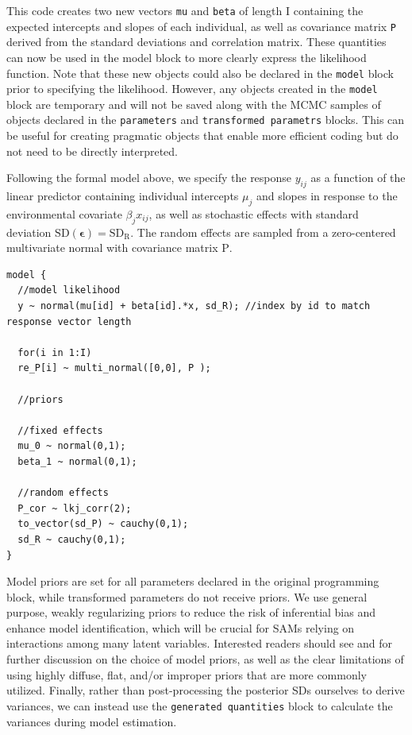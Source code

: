 \documentclass[
]{book}
\begin{document}
This code creates two new vectors \texttt{mu} and \texttt{beta} of length I containing the expected intercepts and slopes of each individual, as well as covariance matrix \texttt{P} derived from the standard deviations and correlation matrix. These quantities can now be used in the model block to more clearly express the likelihood function. Note that these new objects could also be declared in the \texttt{model} block prior to specifying the likelihood. However, any objects created in the \texttt{model} block are temporary and will not be saved along with the MCMC samples of objects declared in the \texttt{parameters} and \texttt{transformed\ parametrs} blocks. This can be useful for creating pragmatic objects that enable more efficient coding but do not need to be directly interpreted.

Following the formal model above, we specify the response \(y_{ij}\) as a function of the linear predictor containing individual intercepts \(\mu_j\) and slopes in response to the environmental covariate \(\beta_jx_{ij}\), as well as stochastic effects with standard deviation \(\mathrm{SD(\boldsymbol{\epsilon})}=\mathrm{SD_R}\). The random effects are sampled from a zero-centered multivariate normal with covariance matrix \(\boldsymbol{\mathrm{P}}\).

\begin{verbatim}
model {
  //model likelihood
  y ~ normal(mu[id] + beta[id].*x, sd_R); //index by id to match response vector length
  
  for(i in 1:I)
  re_P[i] ~ multi_normal([0,0], P );
  
  //priors
  
  //fixed effects
  mu_0 ~ normal(0,1);
  beta_1 ~ normal(0,1);
  
  //random effects
  P_cor ~ lkj_corr(2);
  to_vector(sd_P) ~ cauchy(0,1);
  sd_R ~ cauchy(0,1);
}
\end{verbatim}

Model priors are set for all parameters declared in the original programming block, while transformed parameters do not receive priors. We use general purpose, weakly regularizing priors to reduce the risk of inferential bias and enhance model identification, which will be crucial for SAMs relying on interactions among many latent variables. Interested readers should see \citet{Lemoine2019} and \citet{Rethinking} for further discussion on the choice of model priors, as well as the clear limitations of using highly diffuse, flat, and/or improper priors that are more commonly utilized. Finally, rather than post-processing the posterior SDs ourselves to derive variances, we can instead use the \texttt{generated\ quantities} block to calculate the variances during model estimation.
\end{document}
